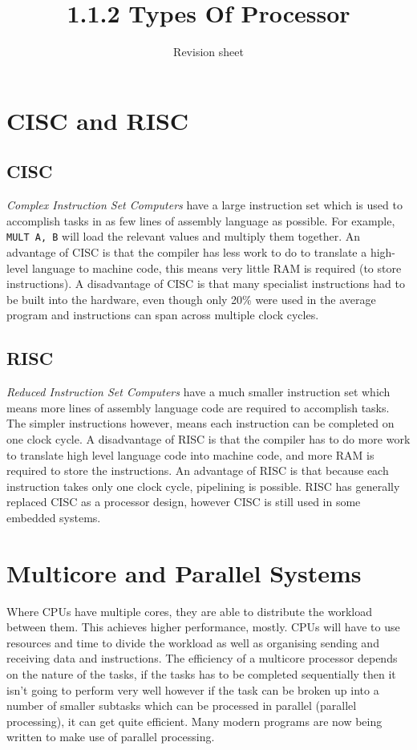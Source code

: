 \documentclass[a4paper,11pt, twocolumn]{article}
\title{1.1.2 Types Of Processor}
\author{Revision sheet}
\date{}
\begin{document}
\maketitle
\thispagestyle{fancy}

\section{CISC and RISC}
\subsection{CISC}
\textit{Complex Instruction Set Computers} have a large instruction set which is used to accomplish tasks in as few lines of assembly language as possible. For example, \verb|MULT A, B| will load the relevant values and multiply them together. An advantage of CISC is that the compiler has less work to do to translate a high-level language to machine code, this means very little RAM is required (to store instructions). A disadvantage of CISC is that many specialist instructions had to be built into the hardware, even though only 20\% were used in the average program and instructions can span across multiple clock cycles.
\subsection{RISC}
\textit{Reduced Instruction Set Computers} have a much smaller instruction set which means more lines of assembly language code are required to accomplish tasks. The simpler instructions however, means each instruction can be completed on one clock cycle. A disadvantage of RISC is that the compiler has to do more work to translate high level language code into machine code, and more RAM is required to store the instructions. An advantage of RISC is that because each instruction takes only one clock cycle, pipelining is possible. RISC has generally replaced CISC as a processor design, however CISC is still used in some embedded systems. 

\section{Multicore and Parallel Systems}
Where CPUs have multiple cores, they are able to distribute the workload between them. This achieves higher performance, mostly. CPUs will have to use resources and time to divide the workload as well as organising sending and receiving data and instructions. The efficiency of a multicore processor depends on the nature of the tasks, if the tasks has to be completed sequentially then it isn't going to perform very well however if the task can be broken up into a number of smaller subtasks which can be processed in parallel (parallel processing), it can get quite efficient. Many modern programs are now being written to make use of parallel processing.
\end{document}

